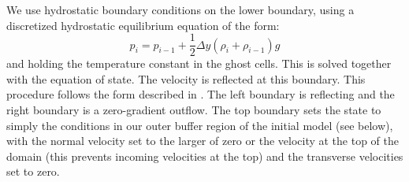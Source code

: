 \documentclass[preprint,times,tighten]{aastex63}
\begin{document}
We use hydrostatic boundary conditions on the lower boundary, using
a discretized hydrostatic equilibrium equation of the form:
\begin{equation}
\label{eq:hse}
p_i = p_{i-1} + \frac{1}{2} \Delta y (\rho_i + \rho_{i-1}) g
\end{equation}
and holding the temperature constant in the ghost cells.  This is solved
together with the equation of state.  The velocity is reflected at this boundary.
This procedure follows the form described in \citet{ppm-hse}.  The
left boundary is reflecting and the right boundary is a zero-gradient
outflow.  The top boundary sets the state to simply the conditions
in our outer buffer region of the initial model (see below), with the
normal velocity set to the larger of zero or the velocity at the top
of the domain (this prevents incoming velocities at the top) and the
transverse velocities set to zero.
\end{document}
